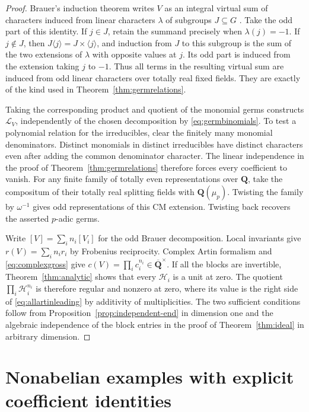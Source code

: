 \documentclass[11pt]{amsart}
\numberwithin{equation}{section}
\theoremstyle{definition}
\theoremstyle{remark}
\newcommand{\Q}{\mathbf Q}
\newcommand{\Qbar}{\overline{\mathbf Q}}
\begin{document}
\begin{proof}
Brauer's induction theorem writes $V$ as an integral virtual
sum of characters induced from linear characters $\lambda$ of
subgroups $J\subseteq G$ \cite[Ch.~VII, \S10]{Neukirch}.
Take the odd part of this identity. If $j\in J$, retain the
summand precisely when $\lambda(j)=-1$. If $j\notin J$, then
$J\langle j\rangle=J\times\langle j\rangle$, and induction
from $J$ to this subgroup is the sum of the two extensions of
$\lambda$ with opposite values at $j$. Its odd part is induced
from the extension taking $j$ to $-1$. Thus all terms in the
resulting virtual sum are induced from odd linear characters over
totally real fixed fields. They are exactly of the kind used in
Theorem~\ref{thm:germrelations}.

Taking the corresponding product and quotient of the monomial
germs constructs $\mathcal L_V$, independently of the chosen
decomposition by \eqref{eq:germbinomials}. To test a polynomial
relation for the irreducibles, clear the finitely many monomial
denominators. Distinct monomials in distinct irreducibles have
distinct characters even after adding the common denominator
character. The linear independence in the proof of
Theorem~\ref{thm:germrelations} therefore forces every coefficient
to vanish. For any finite family of totally even representations
over $\Q$, take the compositum of their totally real splitting
fields with $\Q(\mu_p)$. Twisting the family by $\omega^{-1}$
gives odd representations of this CM extension. Twisting back
recovers the asserted $p$-adic germs.

Write $[V]=\sum_i n_i[V_i]$ for the odd Brauer decomposition.
Local invariants give $r(V)=\sum_i n_i r_i$ by Frobenius
reciprocity. Complex Artin formalism and \eqref{eq:complexgross}
give $c(V)=\prod_i c_i^{n_i}\in\Qbar^\times$. If all the
blocks are invertible, Theorem~\ref{thm:analytic} shows that every
$\mathcal H_i$ is a unit at zero. The quotient
$\prod_i\mathcal H_i^{n_i}$ is therefore regular and nonzero at
zero, where its value is the right side of
\eqref{eq:allartinleading} by additivity of multiplicities.
The two sufficient conditions follow from
Proposition~\ref{prop:independent-end} in dimension one and the
algebraic independence of the block entries in the proof of
Theorem~\ref{thm:ideal} in arbitrary dimension.
\end{proof}

\section{Nonabelian examples with explicit coefficient identities}
\label{sec:examples}
\end{document}
